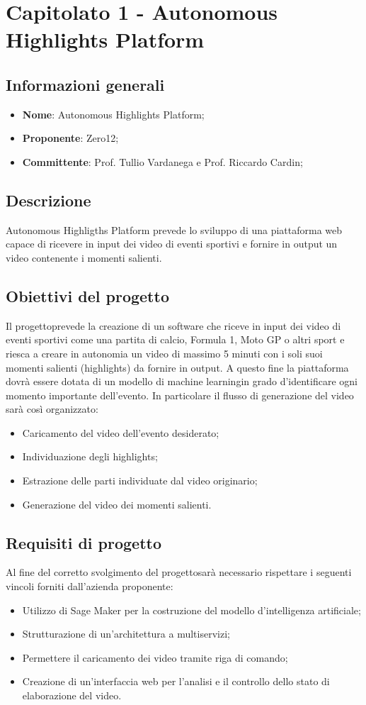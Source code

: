 \section{Capitolato 1 - Autonomous Highlights Platform}
\subsection{Informazioni generali}
\begin{itemize}
	\item \textbf{Nome}: Autonomous Highlights Platform;
	\item \textbf{Proponente}: Zero12;
	\item \textbf{Committente}: Prof. Tullio Vardanega e Prof. Riccardo Cardin;
\end{itemize}
\subsection{Descrizione}
Autonomous Highligths Platform prevede lo sviluppo di una piattaforma web capace di ricevere in input dei video di eventi sportivi e fornire in output un video contenente i momenti salienti.
\subsection{Obiettivi del progetto}
Il progetto\glosp prevede la creazione di un software che riceve in input dei video di eventi sportivi come una partita di calcio, Formula 1, Moto GP o altri sport e riesca a creare in autonomia un video di massimo 5 minuti con i soli suoi momenti salienti (highlights) da fornire in output. A questo fine la piattaforma dovrà essere dotata di un modello di machine learning\glosp in grado d'identificare ogni momento importante dell’evento.
In particolare il flusso di generazione del video sarà così organizzato:
\begin{itemize}
	\item Caricamento del video dell'evento desiderato;
	\item Individuazione degli highlights;
	\item Estrazione delle parti individuate dal video originario;
	\item Generazione del video dei momenti salienti.
\end{itemize}
\subsection{Requisiti di progetto}
Al fine del corretto svolgimento del progetto\glosp sarà necessario rispettare i seguenti vincoli forniti dall'azienda proponente:
\begin{itemize}
	\item Utilizzo di Sage Maker per la costruzione del modello d'intelligenza artificiale\glo;
	\item Strutturazione di un'architettura a multiservizi\glo;
	\item Permettere il caricamento dei video tramite riga di comando;
	\item Creazione di un'interfaccia web per l'analisi e il controllo dello stato di elaborazione del video.
\end{itemize}

